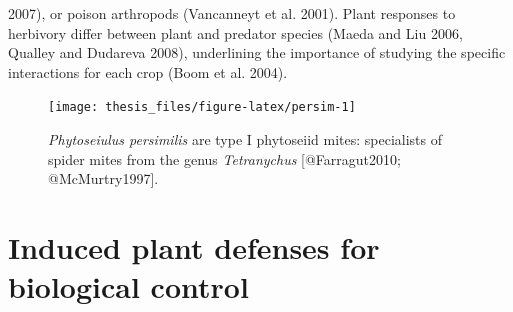 \documentclass[12pt,final,CPage]{ufthesis}
\begin{document}
{2007), or poison arthropods (Vancanneyt et al. 2001). Plant responses to herbivory differ between plant and predator species (Maeda and Liu 2006, Qualley and Dudareva 2008), underlining the importance of studying the specific interactions for each crop (Boom et al. 2004).
  \begin{figure}

  {\centering \texttt{[image: thesis\_files/figure-latex/persim-1]} 

  }

  \caption{\textit{Phytoseiulus persimilis} are type I phytoseiid mites: specialists of spider mites from the genus \textit{Tetranychus} [@Farragut2010; @McMurtry1997].}\label{fig:persim}
  \end{figure}
  \hypertarget{litrev-plantdef}{%
  \section{Induced plant defenses for biological control}\label{litrev-plantdef}}

}
\end{document}
